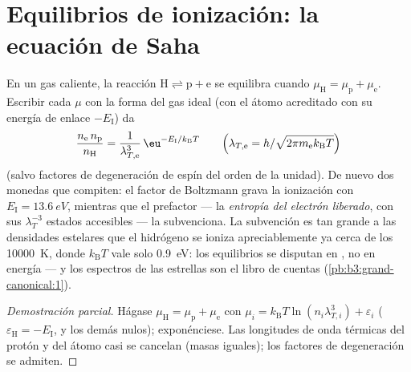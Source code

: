 \section{Equilibrios de ionización: la ecuación de Saha}

\begin{proposition}\label{prop:b3:grand-canonical:saha}
En un gas caliente, la reacción $\text{H} \rightleftharpoons \text{p} +
\text{e}$ se equilibra cuando $\mu_{\text{H}} = \mu_{\text{p}} +
\mu_{\text{e}}$. Escribir cada $\mu$ con la forma del gas ideal (con el
átomo acreditado con su energía de enlace $-E_{\text{I}}$) da
\[
\frac{n_{\text{e}}\,n_{\text{p}}}{n_{\text{H}}}
 = \frac{1}{\lambda_{T,\text{e}}^3}\,
\eu^{-E_{\text{I}}/k_{\text{B}}T}
\qquad\Big(\lambda_{T,\text{e}} =
h/\sqrt{2\pi m_{\text{e}}k_{\text{B}}T}\Big)
\]
(salvo factores de degeneración de espín del orden de la unidad). De nuevo
dos monedas que compiten: el factor de Boltzmann grava la ionización con
$E_{\text{I}} = \qty{13.6}{eV}$, mientras que el prefactor --- la
\emph{entropía del electrón liberado}, con sus $\lambda_T^{-3}$ estados
accesibles --- la subvenciona. La subvención es tan grande a las densidades
estelares que el hidrógeno se ioniza apreciablemente ya cerca de los
\qty{10000}{K}, donde $k_{\text{B}}T$ vale solo
\qty{0.9}{eV}: los equilibrios se disputan en , no en energía
--- y los espectros de las estrellas son el libro de cuentas
(\cref{pb:b3:grand-canonical:1}).
\end{proposition}

\begin{proof}[Demostración parcial]
Hágase $\mu_{\text{H}} = \mu_{\text{p}} + \mu_{\text{e}}$ con $\mu_i
= k_{\text{B}}T\ln(n_i\lambda_{T,i}^3) + \varepsilon_i$
($\varepsilon_{\text{H}} = -E_{\text{I}}$, y los demás nulos);
exponénciese. Las longitudes de onda térmicas del protón y del átomo casi se
cancelan (masas iguales); los factores de degeneración se admiten.
\end{proof}

